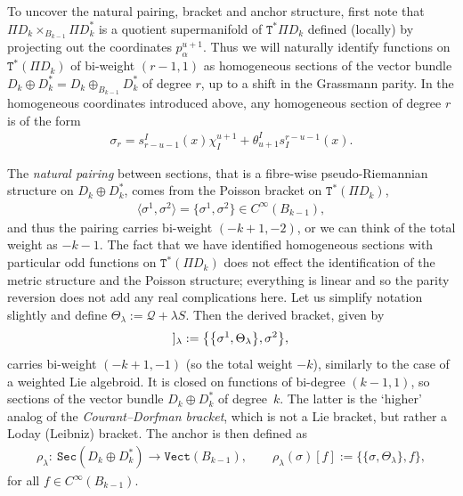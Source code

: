 \documentclass[pdftex]{sigma}
\newcommand{\Dleft}{[\hspace{-1.5pt}[}
\newcommand{\Dright}{]\hspace{-1.5pt}]}
\newcommand{\SN}[1]{\Dleft #1 \Dright}
\def\Sec{\mathtt{Sec}}
\def\Vect{\mathtt{Vect}}
\def\sT{{\mathtt T}}
\numberwithin{equation}{section}
\begin{document}
To uncover the natural pairing, bracket and anchor structure, f\/irst note that $\Pi D_{k} \times_{B_{k-1}} \Pi D_{k}^{*}$ is a  quotient supermanifold of $\sT^{*}\Pi D_{k}$ def\/ined (locally) by projecting out the coordinates $p^{u+1}_{\alpha}$. Thus we will naturally identify functions on $\sT^{*}(\Pi D_{k})$ of bi-weight $(r-1,1)$ as homogeneous sections of  the vector bundle $D_k\oplus D^*_k=D_{k}\oplus_{B_{k-1}} D_{k}^{*}$ of degree $r$, up to a shift in the Grassmann parity.  In the homogeneous coordinates introduced above, any homogeneous section of degree $r$ is of the form
\begin{gather*}
\sigma_{r} = s_{r-u-1}^{I}(x)\chi_{I}^{u+1} + \theta_{u+1}^{I}s_{I}^{r-u-1}(x).
\end{gather*}


The \emph{natural pairing} between sections, that is a f\/ibre-wise pseudo-Riemannian structure on $D_{k}\oplus D_{k}^{*}$,  comes from the Poisson bracket on $\sT^{*}(\Pi D_{k})$,
\begin{gather*}
\langle\sigma^{1}, \sigma^{2} \rangle = \big\{ \sigma^{1}, \sigma^{2} \big\} \in C^{\infty}(B_{k-1}),
\end{gather*}
 and thus the pairing carries bi-weight $(-k+1, -2)$, or we can think of the  total weight as $-k-1$. The fact that we have identif\/ied homogeneous sections with particular odd functions on  $\sT^{*}(\Pi D_{k})$ does not ef\/fect the identif\/ication of the metric structure and the Poisson structure; everything is linear and so the parity reversion does not add any real complications here.
Let us simplify notation slightly and def\/ine  $\Theta_{\lambda} :=  \mathcal{Q} + \lambda   S$.  Then the  derived bracket, given by
\begin{gather*}
\SN{\sigma^{1}, \sigma^{2}}_{\lambda} :=  \big\{\big\{ \sigma^{1}, \Theta_{\lambda} \big\}, \sigma^{2} \big\},
\end{gather*}
carries bi-weight $(-k+1, -1)$  (so the total weight $-k$), similarly to the case of a weighted Lie algebroid. It is closed on functions of bi-degree $(k-1,1)$, so sections of the vector bundle $D_k\oplus D^*_k$ of degree~$k$. The latter is the `higher' analog of the \emph{Courant--Dorfman bracket}, which is not a Lie bracket, but rather a Loday (Leibniz) bracket. The anchor is then def\/ined as
\begin{gather*}
\rho_\lambda\colon \  \Sec( D_{k}\oplus D_{k}^{*} )  \rightarrow  \Vect(B_{k-1}),\qquad
  \rho_\lambda(\sigma)[f]  :=  \{\{ \sigma, \Theta_{\lambda} \}, f \},
\end{gather*}
 for all $f \in C^{\infty}(B_{k-1})$.
\end{document}
